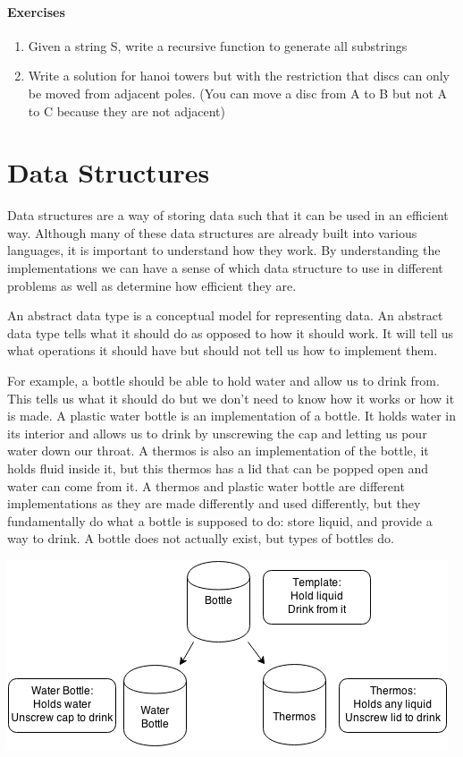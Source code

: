 \documentclass[11pt,oneside]{book}
\makeatletter
\def\maxwidth#1{\ifdim\Gin@nat@width>#1 #1\else\Gin@nat@width\fi}
\makeatother
\begin{document}
\subsection{Exercises}

\begin{enumerate}
\item Given a string S, write a recursive function to generate all substrings
\item Write a solution for hanoi towers but with the restriction that discs can only be moved from adjacent poles. (You can move a disc from A to B but not A to C because they are not adjacent)
\end{enumerate}

\part{ Data Structures }
    

Data structures are a way of storing data such that it can be used in an efficient way. Although many of these data structures are already built into various languages, it is important to understand how they work. By understanding the implementations we can have a sense of which data structure to use in different problems as well as determine how efficient they are.

An abstract data type is a conceptual model for representing data. An abstract data type tells what it should do as opposed to how it should work. It will tell us what operations it should have but should not tell us how to implement them.

For example, a bottle should be able to hold water and allow us to drink from. This tells us what it should do but we don't need to know how it works or how it is made. A plastic water bottle is an implementation of a bottle. It holds water in its interior and allows us to drink by unscrewing the cap and letting us pour water down our throat. A thermos is also an implementation of the bottle, it holds fluid inside it, but this thermos has a lid that can be popped open and water can come from it. A thermos and plastic water bottle are different implementations as they are made differently and used differently, but they fundamentally do what a bottle is supposed to do: store liquid, and provide a way to drink. A bottle does not actually exist, but types of bottles do.

\includegraphics[width=\maxwidth{\textwidth}]{bottle.png}
\end{document}
